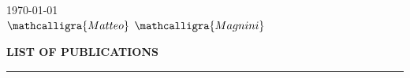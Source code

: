 \documentclass{resume} %
\begin{document}
    \vspace{2em} %
    \begin{flushright}
        \today
        \\
        \vspace{1em}
        \Large$\mathcalligra{Matteo}$  $\mathcalligra{Magnini}$
        
    \end{flushright}

    \pagebreak
    \MakeUppercase{\bf List of Publications} %
    \sectionlineskip
    \hrule %
    \vspace{-1cm}
    \nocite{*}
     
    \renewcommand\refname{}
    
    
\end{document}
